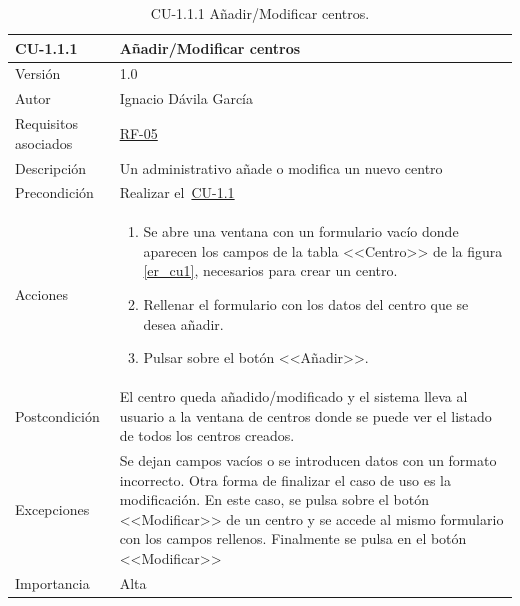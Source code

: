 \begin{table}[p]
	\centering
	\begin{tabularx}{\linewidth}{ p{} p{} }
		\toprule
		\textbf{CU-1.1.1}    & \textbf{Añadir/Modificar centros}\\
		\toprule
		{\small Versión}              & 1.0    \\
		{\small Autor}                & Ignacio Dávila García \\
		{\small Requisitos asociados} & \hyperref[itm:RF5]{RF-05} \\
		{\small Descripción}          & Un administrativo añade o modifica un nuevo centro \\
		{\small Precondición}         & Realizar el~\hyperref[table:CU-1_1]{CU-1.1} \\
		{\small Acciones}             &
		\begin{enumerate}
			\def\labelenumi{\arabic{enumi}.}
			\tightlist
			\item Se abre una ventana con un formulario vacío donde aparecen los campos de la tabla <<Centro>> de la figura \ref{er_cu1}, necesarios para crear un centro.
			\item Rellenar el formulario con los datos del centro que se desea añadir.
			\item Pulsar sobre el botón <<Añadir>>.
		\end{enumerate}\\
		{\small Postcondición}        & El centro queda añadido/modificado y el sistema lleva al usuario a la ventana de centros donde se puede ver el listado de todos los centros creados. \\
		{\small Excepciones}          & Se dejan campos vacíos o se introducen datos con un formato incorrecto. Otra forma de finalizar el caso de uso es la modificación. En este caso, se pulsa sobre el botón <<Modificar>> de un centro y se accede al mismo formulario con los campos rellenos. Finalmente se pulsa en el botón <<Modificar>> \\
		{\small Importancia}          & Alta \\
		\bottomrule
	\end{tabularx}
	\caption{CU-1.1.1 Añadir/Modificar centros.}\label{table:CU-1_1_1}
\end{table}
\FloatBarrier

